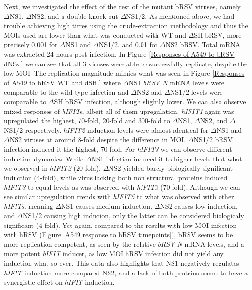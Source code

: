 Next, we investigated the effect of the rest of the mutant bRSV viruses, namely \(\Delta\)NS1, \(\Delta\)NS2, and a double knock-out \(\Delta\)NS1/2. As mentioned above, we had trouble achieving high titres using the crude-extraction methodology and thus the MOIs used are lower than what was conducted with WT and \(\Delta\)SH bRSV, more precisely 0.001 for \(\Delta\)NS1 and \(\Delta\)NS1/2, and 0.01 for \(\Delta\)NS2 bRSV. Total mRNA was extracted 24 hours post infection. In Figure \ref{Responses of A549 to bRSV dNSs.} we can see that all 3 viruses were able to successfully replicate, despite the low MOI. The replication magnitude mimics what was seen in Figure \ref{Responses of A549 to bRSV WT and dSH.} where \(\Delta\)NS1 \textit{bRSV N} mRNA levels were comparable to the wild-type infection and \(\Delta\)NS2 and \(\Delta\)NS1/2 levels were comparable to \(\Delta\)SH bRSV infection, although slightly lower. We can also observe mixed responses of \textit{hIFITs}, albeit all of them upregulation. \textit{hIFIT1} again was upregulated the highest, 70-fold, 20-fold and 300-fold to \(\Delta\)NS1, \(\Delta\)NS2, and \(\Delta\)NS1/2 respectively. \textit{hIFIT2} induction levels were almost identical for \(\Delta\)NS1 and \(\Delta\)NS2 viruses at around 8-fold despite the difference in MOI. \(\Delta\)NS1/2 bRSV infection induced it the highest, 70-fold. For \textit{hIFIT3} we can observe different induction dynamics. While \(\Delta\)NS1 infection induced it to higher levels that what we observed in \textit{hIFIT2} (20-fold), \(\Delta\)NS2 yielded barely biologically significant induction (4-fold), while virus lacking both non structural proteins induced \textit{hIFIT3} to equal levels as was observed with \textit{hIFIT2} (70-fold). Although we can see similar upregulation trends with \textit{hIFIT5} to what was observed with other \textit{hIFITs}, meaning \(\Delta\)NS1 causes medium induction, \(\Delta\)NS2 causes low induction, and \(\Delta\)NS1/2 causing high inducion, only the latter can be considered biologicaly significant (4-fold). Yet again, compared to the results with low MOI infection with hRSV (Figure \ref{A549 response to hRSV timepoints}), bRSV seems to be more replication competent, as seen by the relative \textit{bRSV N} mRNA levels, and a more potent \textit{hIFIT} inducer, as low MOI hRSV infection did not yield any induction what so ever. This data also highlights that NS1 negatively regulates \textit{hIFIT} induction more compared NS2, and a lack of both proteins seems to have a synergistic effect on \textit{hIFIT} induction.


